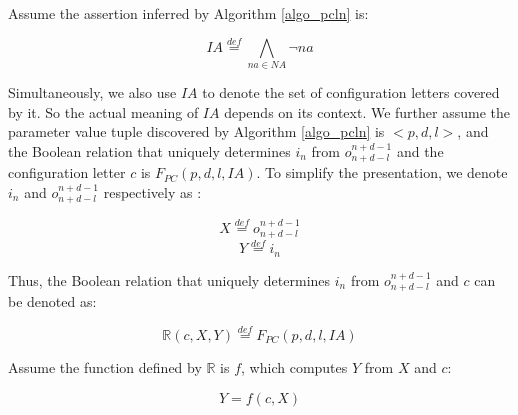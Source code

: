 \documentclass[journal]{IEEEtran}
\begin{document}

%

Assume the assertion inferred by Algorithm \ref{algo_pcln} is:

\begin{equation}\label{equ_fdia}
IA\stackrel{def}{=}\bigwedge_{na\in NA}\neg na
\end{equation}

Simultaneously,
we also use $IA$ to denote the set of configuration letters covered by it.
So the actual meaning of $IA$ depends on its context.
We further assume the parameter value tuple discovered by Algorithm \ref{algo_pcln} is $<p, d, l>$,
and the Boolean relation that uniquely determines $i_n$ from $o_{n+d-l}^{n+d-1}$ and the configuration letter $c$ is $F_{PC}(p,d,l,IA)$.
To simplify the presentation, we denote $i_n$ and $o_{n+d-l}^{n+d-1}$ respectively as :

\begin{equation}\label{equ_fdin}
X\stackrel{def}{=} o_{n+d-l}^{n+d-1}
\end{equation}
\begin{equation}\label{equ_fdo}
Y\stackrel{def}{=} i_n
\end{equation}

Thus,
the Boolean relation that uniquely determines $i_n$ from $o_{n+d-l}^{n+d-1}$ and $c$ can be denoted as:

\begin{equation}\label{equ_fdR}
\mathbb{R}(c,X,Y)\stackrel{def}{=} F_{PC}(p,d,l,IA)
\end{equation}


Assume the function defined by $\mathbb{R}$ is $f$,
which computes  $Y$ from $X$ and $c$:

\begin{equation}\label{equ_fdf}
Y=f(c,X)
\end{equation}
\end{document}
